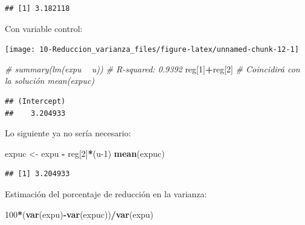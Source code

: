 \documentclass[
]{book}
\newenvironment{Shaded}{\begin{snugshade}}{\end{snugshade}}
\newcommand{\CommentTok}[1]{\textcolor[rgb]{0.56,0.35,0.01}{\textit{#1}}}
\newcommand{\DataTypeTok}[1]{\textcolor[rgb]{0.13,0.29,0.53}{#1}}
\newcommand{\DecValTok}[1]{\textcolor[rgb]{0.00,0.00,0.81}{#1}}
\newcommand{\KeywordTok}[1]{\textcolor[rgb]{0.13,0.29,0.53}{\textbf{#1}}}
\newcommand{\NormalTok}[1]{#1}
\newcommand{\OperatorTok}[1]{\textcolor[rgb]{0.81,0.36,0.00}{\textbf{#1}}}
\newcommand{\StringTok}[1]{\textcolor[rgb]{0.31,0.60,0.02}{#1}}
\theoremstyle{break}
\theoremstyle{definition}
\theoremstyle{definition}
\theoremstyle{definition}
\theoremstyle{remark}
\begin{document}
\begin{verbatim}
## [1] 3.182118
\end{verbatim}

Con variable control:

\begin{Shaded}
\end{Shaded}

\begin{center}\texttt{[image: 10-Reduccion\_varianza\_files/figure-latex/unnamed-chunk-12-1]} \end{center}

\begin{Shaded}
\begin{Highlighting}[]
\CommentTok{# summary(lm(expu ~ u)) # R-squared: 0.9392}
\NormalTok{reg[}\DecValTok{1}\NormalTok{]}\OperatorTok{+}\NormalTok{reg[}\DecValTok{2}\NormalTok{] }\CommentTok{# Coincidirá con la solución mean(expuc)}
\end{Highlighting}
\end{Shaded}

\begin{verbatim}
## (Intercept) 
##    3.204933
\end{verbatim}

Lo siguiente ya no sería necesario:

\begin{Shaded}
\begin{Highlighting}[]
\NormalTok{expuc <-}\StringTok{ }\NormalTok{expu }\OperatorTok{-}\StringTok{ }\NormalTok{reg[}\DecValTok{2}\NormalTok{]}\OperatorTok{*}\NormalTok{(u}\DecValTok{-1}\NormalTok{)}
\KeywordTok{mean}\NormalTok{(expuc)  }
\end{Highlighting}
\end{Shaded}

\begin{verbatim}
## [1] 3.204933
\end{verbatim}

Estimación del porcentaje de reducción en la varianza:

\begin{Shaded}
\begin{Highlighting}[]
\DecValTok{100}\OperatorTok{*}\NormalTok{(}\KeywordTok{var}\NormalTok{(expu)}\OperatorTok{-}\KeywordTok{var}\NormalTok{(expuc))}\OperatorTok{/}\KeywordTok{var}\NormalTok{(expu)}
\end{Highlighting}
\end{Shaded}
\end{document}

